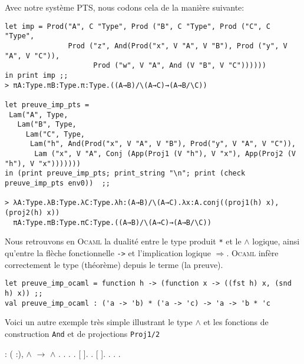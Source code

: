 Avec notre système PTS, nous codons cela de la manière suivante:
\begin{Verbatim}
let imp = Prod("A", C "Type", Prod ("B", C "Type", Prod ("C", C "Type",
               Prod ("z", And(Prod("x", V "A", V "B"), Prod ("y", V "A", V "C")), 
                     Prod ("w", V "A", And (V "B", V "C"))))))
in print imp ;;
> πA:Type.πB:Type.π:Type.((A→B)/\(A→C)→(A→B/\C))

let preuve_imp_pts = 
 Lam("A", Type,
   Lam("B", Type,
     Lam("C", Type, 
      Lam("h", And(Prod("x", V "A", V "B"), Prod("y", V "A", V "C")), 
       Lam ("x", V "A", Conj (App(Proj1 (V "h"), V "x"), App(Proj2 (V "h"), V "x"))))))) 
in (print preuve_imp_pts; print_string "\n"; print (check preuve_imp_pts env0))  ;;

> λA:Type.λB:Type.λC:Type.λh:(A→B)/\(A→C).λx:A.conj((proj1(h) x),(proj2(h) x))
  πA:Type.πB:Type.πC:Type.((A→B)/\(A→C)→(A→B/\C))
\end{Verbatim}
Nous retrouvons en \textsc{Ocaml} la dualité entre le type produit \verb+*+ et le $\wedge$ logique,
 ainsi qu'entre la flèche fonctionnelle \verb+->+ et l'implication logique $\Rightarrow$.
\textsc{Ocaml} infère correctement le type (théorème) depuis le terme (la preuve).

\begin{Verbatim}
let preuve_imp_ocaml = function h -> (function x -> ((fst h) x, (snd h) x)) ;;
val preuve_imp_ocaml : ('a -> 'b) * ('a -> 'c) -> 'a -> 'b * 'c 
\end{Verbatim}

Voici un autre exemple très simple illustrant le type $\wedge$ et les fonctions de construction \verb+And+ et de projections \verb+Proj1/2+

\begin{coqdoccode}
\coqdocnoindent
{} : \coqdockw{\ensuremath{\forall}} ( :), \ensuremath{\land} \ensuremath{\rightarrow} \ensuremath{\land} .\coqdoceol
\coqdocnoindent
{}.\coqdoceol
\coqdocindent{0.50em}
   .\coqdoceol
\coqdocindent{0.50em}
.\coqdoceol
\coqdocindent{0.50em}
   [  ].\coqdoceol
\coqdocindent{0.50em}
.\coqdoceol
\coqdocindent{0.50em}
   [ ].\coqdoceol
\coqdocindent{0.50em}
.\coqdoceol
\coqdocnoindent
{}.\coqdoceol
\coqdocemptyline
\coqdocnoindent
{} .\coqdoceol
\coqdocemptyline
\end{coqdoccode}

